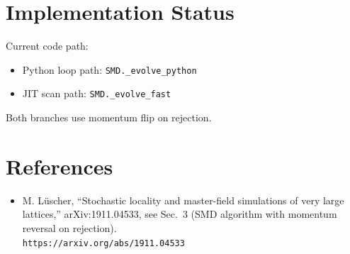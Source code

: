 \documentclass[11pt]{article}
\begin{document}
\section{Implementation Status}
Current code path:
\begin{itemize}
  \item Python loop path: \texttt{SMD.\_evolve\_python}
  \item JIT scan path: \texttt{SMD.\_evolve\_fast}
\end{itemize}
Both branches use momentum flip on rejection.

\section{References}
\begin{itemize}
  \item M. L\"uscher, ``Stochastic locality and master-field simulations of very large lattices,'' arXiv:1911.04533, see Sec.~3 (SMD algorithm with momentum reversal on rejection). \\
  \texttt{https://arxiv.org/abs/1911.04533}
\end{itemize}
\end{document}
